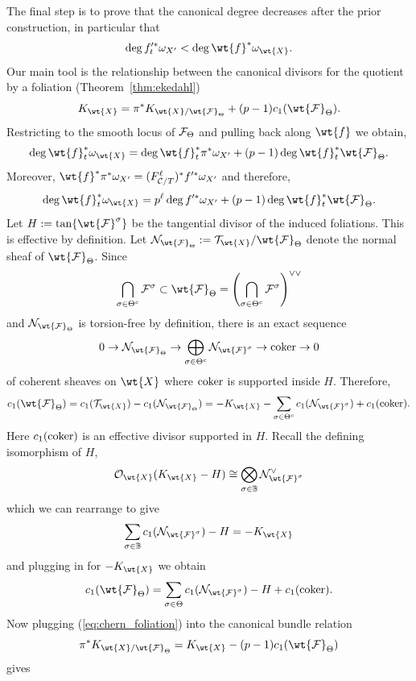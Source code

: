 \documentclass[main.tex]{subfiles}
\begin{document}
{The final step is to prove that the canonical degree decreases after the prior construction, in particular that 
\[ \deg{f'^*_t \omega_{X'}} < \deg{\wt{f}^* \omega_{\wt{X}}}. \]
Our main tool is the relationship between the canonical divisors for the quotient by a foliation (Theorem~\ref{thm:ekedahl})
\[ K_{\wt{X}} = \pi^* K_{\wt{X}/\wt{\F}_{\Theta}} + (p-1) c_1(\wt{\F}_{\Theta}). \]
Restricting to the smooth locus of $\mathcal{F}_{\Theta}$ and pulling back along $\wt{f}$ we obtain,
\[ \deg{\wt{f}_t^* \omega_{\wt{X}}} = \deg{\wt{f}_t^* \pi^* \omega_{X'}} + (p-1) \deg{\wt{f}_t^* \wt{\F}_{\Theta}}. \]
Moreover, $\wt{f}^* \pi^* \omega_{X'} = (F^{\ell}_{\cC/T})^* f'^* \omega_{X'}$ and therefore, 
\begin{equation} \label{eq:degree_equality_theta}
\deg{\wt{f}_t^* \omega_{\wt{X}}} = p^{\ell} \deg{f'^* \omega_{X'}} + (p-1) \deg{\wt{f}_t^* \wt{\F}_{\Theta}}.
\end{equation}
Let $H  := \tan \{ \wt{\F}^{\sigma} \}$ be the tangential divisor of the induced foliations. This is effective by definition. Let $\cN_{\wt{\F}_{\Theta}} := \cT_{\wt{X}} / \wt{\F}_{\Theta}$ denote the normal sheaf of $\wt{\F}_{\Theta}$. 
Since 
\[ \bigcap_{\sigma \in \Theta^c} \F^{\sigma} \subset \wt{\F}_{\Theta}  = \left( \bigcap_{\sigma \in \Theta^c} \F^{\sigma} \right)^{\vee \vee} \]
and $\cN_{\wt{\F}_{\Theta}}$ is torsion-free by definition,
there is an exact sequence
\[ 0 \to \cN_{\wt{\F}_{\Theta}} \to \bigoplus_{\sigma \in \Theta^c} \cN_{\wt{\F}^{\sigma}} \to \coker \to 0 \]
of coherent sheaves on $\wt{X}$ where $\operatorname{\mathrm{coker}}$ is supported inside $H$. Therefore, 
\[ c_1(\wt{\F}_{\Theta}) = c_1(\cT_{\wt{X}}) - c_1(\cN_{\wt{\F}_{\Theta}}) = -K_{\wt{X}} - \sum_{\sigma \in \Theta^c} c_1(\cN_{\wt{\F}^{\sigma}}) + c_1(\coker). \]
Here $c_1(\operatorname{\mathrm{coker}})$ is an effective divisor supported in $H$. Recall the defining isomorphism of $H$,
\[ \cO_{\wt{X}}(K_{\wt{X}} - H) \cong \bigotimes_{\sigma \in \BB} \cN_{\wt{\F}^{\sigma}}^{\vee} \]
which we can rearrange to give
\[ \sum_{\sigma \in \BB} c_1(\cN_{\wt{\F}^{\sigma}}) - H = -K_{\wt{X}} \]
and plugging in for $-K_{\wt{X}}$ we obtain
\begin{equation} \label{eq:chern_foliation}
c_1(\wt{\F}_{\Theta}) = \sum_{\sigma \in \Theta} c_1(\cN_{\wt{\F}^{\sigma}}) - H + c_1(\coker).
\end{equation}
Now plugging (\ref{eq:chern_foliation}) into the canonical bundle relation
\[ \pi^* K_{\wt{X} / \wt{\F}_{\Theta}} = K_{\wt{X}} - (p-1) c_1(\wt{\F}_{\Theta}) \]
gives
\begin{align} \label{eq:canonical_divisor_relation_theta}

\end{align}}
\end{document}

